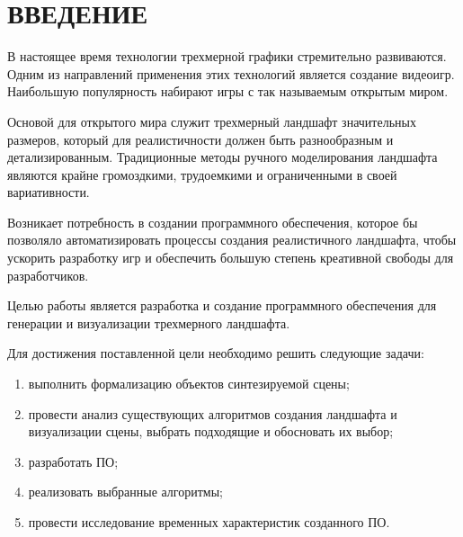 
\chapter*{ВВЕДЕНИЕ}


В настоящее время технологии трехмерной графики стремительно развиваются.
Одним из направлений применения этих технологий является создание видеоигр.
Наибольшую популярность набирают игры с так называемым открытым миром.

Основой для открытого мира служит трехмерный ландшафт значительных размеров, который для реалистичности должен быть разнообразным и детализированным.
Традиционные методы ручного моделирования ландшафта являются крайне громоздкими, трудоемкими и ограниченными в своей вариативности. 

Возникает потребность в создании программного обеспечения, которое бы позволяло автоматизировать процессы создания реалистичного ландшафта, чтобы ускорить разработку игр и обеспечить большую степень креативной свободы для разработчиков.

Целью работы является разработка и создание программного обеспечения для генерации и визуализации трехмерного ландшафта.

Для достижения поставленной цели необходимо решить следующие задачи: 

\begin{enumerate}[label={\arabic*)}]
	\item выполнить формализацию объектов синтезируемой сцены;
	\item провести анализ существующих алгоритмов создания ландшафта и визуализации сцены, выбрать подходящие и обосновать их выбор;
	\item разработать ПО;
	\item реализовать выбранные алгоритмы;
	\item провести исследование временных характеристик созданного ПО.
\end{enumerate}

